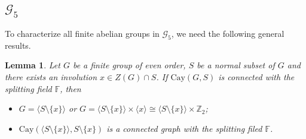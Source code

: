 \documentclass[12pt,a4paper]{article}
\newtheorem{lem}[thm]{Lemma}
\begin{document}
	\subsection{$\mathcal{G}_5$}
	To characterize all finite abelian groups in $\mathcal{G}_5$, we need the following general results.
	\begin{lem}\label{-1}
		Let $G$ be a finite group of even order, $S$ be a normal subset of $G$ and there exists an involution $x\in Z(G)\cap S$. If $\mathrm{Cay}(G,S)$ is connected with the splitting field $\mathbb{F}$, then 
		\begin{itemize}
			\item [$(1)$] $G=\langle S\setminus\{x\}\rangle$ or $G=\langle S\setminus\{x\}\rangle\times\langle x\rangle\cong \langle S\setminus\{x\}\rangle\times\mathbb{Z}_2$;
			\item [$(2)$] $\mathrm{Cay}(\langle S\setminus\{x\}\rangle, S\setminus\{x\})$ is a connected graph with the splitting filed $\mathbb{F}$. 
		\end{itemize}
	\end{lem}
\end{document}
